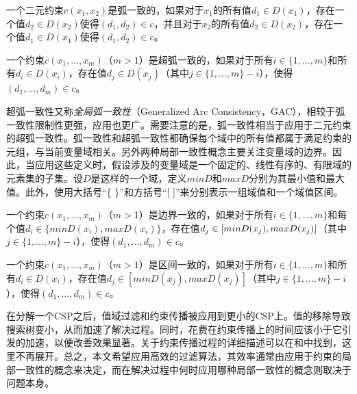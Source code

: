 \begin{definition}
    一个二元约束$c(x_1, x_2)$是弧一致的，如果对于$x_1$的所有值$d_1 \in D(x_1)$，存在一个值$d_2 \in D(x_2)$使得$(d_1, d_2) \in c$，并且对于$x_2$的所有值$d_2 \in D(x_2)$，存在一个值$d_1 \in D(x_1)$使得$(d_1, d_2) \in c$。
\end{definition}

\begin{definition}
    一个约束$c(x_1, ..., x_m)$（$m>1$）是超弧一致的，如果对于所有$i \in \{1, ..., m\}$和所有$d_i \in D(x_i)$，存在值$d_j \in D(x_j)$（其中$j \in \{1, ..., m\} - i$），使得$(d_1, ..., d_m) \in c$。
\end{definition}

超弧一致性又称\textit{全局弧一致性}（Generalized Arc Consistency，GAC），相较于弧一致性限制性更强，应用也更广。需要注意的是，弧一致性相当于应用于二元约束的超弧一致性。弧一致性和超弧一致性都确保每个域中的所有值都属于满足约束的元组，与当前变量域相关。另外两种局部一致性概念主要关注变量域的边界。因此，当应用这些定义时，假设涉及的变量域是一个固定的、线性有序的、有限域的元素集的子集。设$D$是这样的一个域，定义$min D$和$max D$分别为其最小值和最大值。此外，使用大括号“\{ \}”和方括号“[ ]”来分别表示一组域值和一个域值区间。

\begin{definition}
    一个约束$c(x_1, ..., x_m)$（$m>1$）是边界一致的，如果对于所有$i \in \{1, ..., m\}$和每个值$d_i \in \{min D(x_i), max D(x_i)\}$，存在值$d_j \in [min D(x_j), \\ max D(x_j)]$（其中$j \in \{1, ..., m\} - i$），使得$(d_1, ..., d_m) \in c$。
\end{definition}

\begin{definition}
    一个约束$c(x_1, ..., x_m)$（$m>1$）是区间一致的，如果对于所有$i \in \{1, ..., m\}$和所有$d_i \in D(x_i)$，存在值$d_j \in [min D(x_j), max D(x_j)]$（其中$j \in \{1, ..., m\} - i$），使得$(d_1, ..., d_m) \in c$。
\end{definition}

在分解一个CSP之后，值域过滤和约束传播被应用到更小的CSP上。值的移除导致搜索树变小，从而加速了解决过程。同时，花费在约束传播上的时间应该小于它引发的加速，以便改善效果显著。关于约束传播过程的详细描述可以在\cite{apt1999essence}和\cite{apt2003principles}中找到，这里不再展开。总之，本文希望应用高效的过滤算法，其效率通常由应用于约束的局部一致性的概念来决定，而在解决过程中何时应用哪种局部一致性的概念则取决于问题本身。


